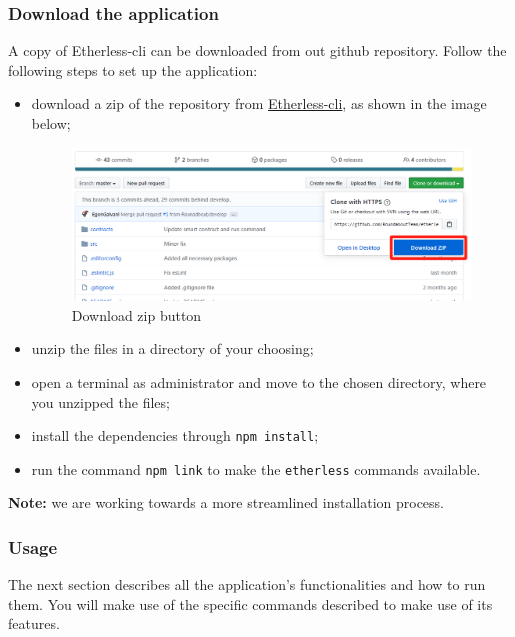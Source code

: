     \subsubsection{Download the application}
      A copy of Etherless-cli can be downloaded from out github repository. Follow the following steps to set up the application:
      \begin{itemize}
        \item download a zip of the repository from \href{https://github.com/RoundaboutTeam/etherless-cli/tree/master}{Etherless-cli}, as shown in the image below;
        \begin{figure}[H]
    			\centering
    			\includegraphics[width=1.1\textwidth]{./res/img/down_zip_repo.png}
    			\caption{Download zip button}
    		\end{figure}
        \item unzip the files in a directory of your choosing;
        \item open a terminal as administrator and move to the chosen directory, where you unzipped the files;
        \item install the dependencies through \texttt{npm install};
        \item run the command \texttt{npm link} to make the \texttt{etherless} commands available.
      \end{itemize}
      \textbf{Note:} we are working towards a more streamlined installation process.
    \subsubsection{Usage}
      The next section describes all the application's functionalities and how to run them. You will make use of the specific commands described to make use of its features.
